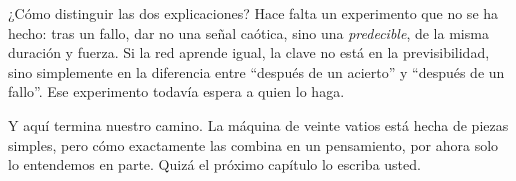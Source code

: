 ¿Cómo distinguir las dos explicaciones? Hace falta un experimento que no se ha hecho: tras un fallo, dar no una señal caótica, sino una \emph{predecible}, de la misma duración y fuerza. Si la red aprende igual, la clave no está en la previsibilidad, sino simplemente en la diferencia entre “después de un acierto” y “después de un fallo”. Ese experimento todavía espera a quien lo haga.

Y aquí termina nuestro camino. La máquina de veinte vatios está hecha de piezas simples, pero cómo exactamente las combina en un pensamiento, por ahora solo lo entendemos en parte. Quizá el próximo capítulo lo escriba usted.

